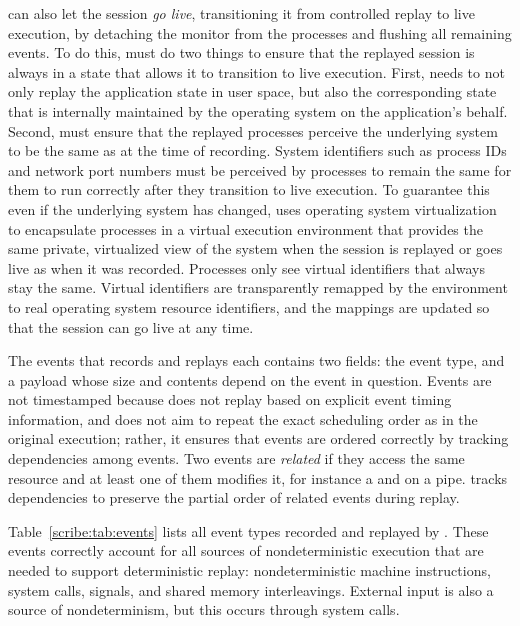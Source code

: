 \begin{table}[]
\scribe{} can also let the session {\em go live}, transitioning it
from controlled replay to live execution, by detaching the monitor
from the processes and flushing all remaining events.  To do this,
\scribe{} must do two things to ensure that the replayed session
is always in a state that allows it to transition to live execution.
First, \scribe{} needs to not only replay the application state in
user space, but also the corresponding state that is internally
maintained by the operating system on the application's behalf.
Second, \scribe{} must ensure that the replayed processes perceive the
underlying system to be the same as at the time of recording.  
System identifiers such as process IDs and network port numbers must
be perceived by processes to remain the same for them to run correctly
after they transition to live execution.  To guarantee this
even if the underlying system has changed, \scribe{} uses operating
system virtualization~\cite{zap02} to encapsulate processes in a
virtual execution environment that provides the same private,
virtualized view of the system when the session is replayed or goes
live as when it was recorded.  Processes only see virtual identifiers
that always stay the same.  Virtual identifiers are transparently
remapped by the environment to real operating system resource
identifiers, and the mappings are updated so that the session can go
live at any time.

The events that \scribe{} records and replays each contains two fields:
the event type, and a payload whose size and contents depend
on the event in question.  Events are not timestamped
because \scribe{} does not replay based on explicit event timing
information, and does not aim to repeat the exact scheduling
order as in the original execution; rather, it ensures that events are
ordered correctly by tracking dependencies among events.  Two events
are {\em related} if they access the same resource and at least one of
them modifies it, for instance a  and  on a
pipe.  \scribe{} tracks dependencies to preserve the partial order of
related events during replay.  

Table~\ref{scribe:tab:events} lists all
event types recorded and replayed by \scribe{}.  These events
correctly account for all sources of nondeterministic execution that
are needed to support deterministic replay: nondeterministic machine
instructions, system calls, signals, and shared memory interleavings.
External input is also a source of nondeterminism, but this occurs
through system calls.


\end{table}

